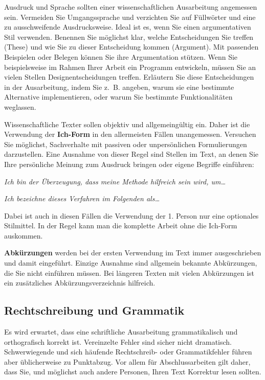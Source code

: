 Ausdruck und Sprache sollten einer wissenschaftlichen Ausarbeitung angemessen sein.
Vermeiden Sie Umgangssprache und verzichten Sie auf Füllwörter und eine zu ausschweifende Ausdrucksweise.
Ideal ist es, wenn Sie einen argumentativen Stil verwenden.
Benennen Sie möglichst klar, welche Entscheidungen Sie treffen (These) und wie Sie zu dieser Entscheidung kommen (Argument).
Mit passenden Beispielen oder Belegen können Sie ihre Argumentation stützen.
Wenn Sie beispielsweise im Rahmen Ihrer Arbeit ein Programm entwickeln, müssen Sie an vielen Stellen Designentscheidungen treffen.
Erläutern Sie diese Entscheidungen in der Ausarbeitung, indem Sie z.~B. angeben, warum sie eine bestimmte Alternative implementieren, oder warum Sie bestimmte Funktionalitäten weglassen.

Wissenschaftliche Texter sollen objektiv und allgemeingültig ein.
Daher ist die Verwendung der \textbf{Ich-Form} in den allermeisten Fällen unangemessen.
Versuchen Sie möglichst, Sachverhalte mit passiven oder unpersönlichen Formulierungen darzustellen.
Eine Ausnahme von dieser Regel sind Stellen im Text, an denen Sie Ihre persönliche Meinung zum Ausdruck bringen oder eigene Begriffe einführen:
\begin{compactitem}
\item \textit{\glqq{}Ich bin der Überzeugung, dass meine Methode hilfreich sein wird, um\dots\grqq{}}
\item \textit{\glqq{}Ich bezeichne dieses Verfahren im Folgenden als\dots\grqq{}}
\end{compactitem}
Dabei ist auch in diesen Fällen die Verwendung der 1. Person nur eine optionales Stilmittel.
In der Regel kann man die komplette Arbeit ohne die Ich-Form auskommen.


\textbf{Abkürzungen} werden bei der ersten Verwendung im Text immer ausgeschrieben und damit eingeführt.
Einzige Ausnahme sind allgemein bekannte Abkürzungen, die Sie nicht einführen müssen.
Bei längeren Texten mit vielen Abkürzungen 	ist ein zusätzliches Abkürzungsverzeichnis hilfreich.




\subsection{Rechtschreibung und Grammatik}

Es wird erwartet, dass eine schriftliche Ausarbeitung grammatikalisch und orthografisch korrekt ist.
Vereinzelte Fehler sind sicher nicht dramatisch.
Schwerwiegende und sich häufende Rechtschreib- oder Grammatikfehler führen aber üblicherweise zu Punktabzug.
Vor allem für Abschlussarbeiten gilt daher, dass Sie, und möglichst auch andere Personen,  Ihren Text Korrektur lesen sollten.




